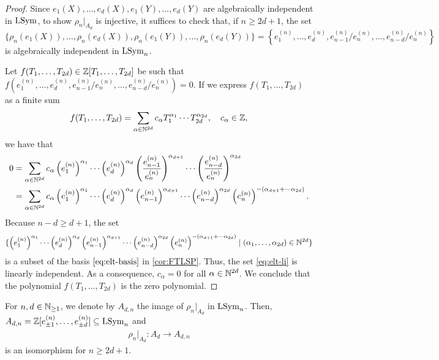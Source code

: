 \documentclass[11pt]{amsart}
\begin{document}
\begin{proof}
    Since \(e_1(X),\dots,e_d(X),e_1 (Y),\dots,e_d(Y)\) are algebraically independent in \(\mathrm{LSym}\), to show \(\rho_n|_{A_d}\) is injective, it suffices to check that, if \(n \geq 2d + 1\), the set
    \[\{\rho_n(e_1(X)),\dots,\rho_n(e_d (X)),\rho_n (e_1 (Y)),\dots,\rho_n  (e_d(Y))\}=\left\{e_1^{(n)},\dots, e_d^{(n)}, e_{n- 1}^{(n)} /e_n^{(n)},\dots,  e_{n - d}^{(n)}/e_n^{(n)} \right\}\] is algebraically independent in \(\mathrm{LSym}_n\).

    Let \(f(T_1, \dots, T_{2d}) \in \mathbb{Z} [T_1,\dots,T_{2d}]\) be such that \(f(e_1^{(n)},\dots, e_d^{(n)},e_{n - 1}^{(n)}/e_n^{(n)},\dots,e_{n -d}^{(n)}/e_n^{(n)}) = 0\). If we express \(f(T_1, \dots, T_{2d})\) as a finite sum
    \[
    f(T_1, \dots, T_{2d}) =\sum_{\alpha \in \mathbb{N}^{2d}} c_\alpha T_1^{\alpha_1} \cdots T_{2d}^{\alpha_{2d}}, \quad c_\alpha \in \mathbb{Z},
    \]
    we have that
    \begin{align*}
    0 
    &= \sum_{\alpha \in \mathbb{N}^{2d}} c_\alpha \left(e_1^{(n)}\right)^{\alpha_1} \cdots \left(e_d^{(n)}\right) ^{\alpha_{d}} \left(\frac{e_{n -1}^{(n)}}{e_n^{(n)}}\right)^{\alpha_{d + 1}} \cdots \left(\frac{e_{n -d}^{(n)}}{e_n^{(n)}}\right)^{\alpha_{2d}}\\
    &=\sum_{\alpha \in \mathbb{N}^{2d}} c_\alpha \left(e_1^{(n)}\right) ^{\alpha_1} \cdots \left(e_d^{(n)}\right) ^{\alpha_{d}} \left(e_{n -1}^{(n)}\right) ^{\alpha_{d + 1}} \cdots \left(e_{n -d}^{(n)}\right) ^{\alpha_{2d}} \left(e_n^{(n)}\right) ^{-(\alpha_{d + 1} + \cdots \alpha_{2d})}.
    \end{align*}
    Because \(n  - d\geq d + 1\), the set
    \begin{align}
        \{\left(e_1^{(n)}\right) ^{\alpha_1} \cdots \left(e_d^{(n)}\right) ^{\alpha_{d}} \left(e_{n -1}^{(n)}\right) ^{\alpha_{d + 1}} \cdots \left(e_{n -d}^{(n)}\right) ^{\alpha_{2d}} \left(e_n^{(n)}\right) ^{-(\alpha_{d + 1} + \cdots \alpha_{2d})} \mid (\alpha_1,\dots,\alpha_{2d}) \in \mathbb{N}^{2d}\} \label{eq:elt-li}
    \end{align}
    is a subset of the basis $\cref{eq:elt-basis}$ in \cref{cor:FTLSP}. Thus, the set \cref{eq:elt-li} is linearly independent. As a consequence,  \(c_\alpha = 0\) for all \(\alpha \in \mathbb{N}^{2d}\). We conclude that the polynomial \(f(T_1, \dots, T_{2d})\) is the zero polynomial. 
\end{proof}


\begin{cor} \label{cor:giraffe}
For $n,d \in \mathbb{N}_{\geq 1}$, we denote by $A_{d,n}$ the image of $\rho_n|_{A_d}$ in $\mathrm{LSym}_n$. Then, \(A_{d,n} = \mathbb{Z} [e_{\pm1}^{(n)},\dots,e_{\pm d}^{(n)}] \subseteq \mathrm{LSym}_n\) and
    \begin{align*}
    \rho_n|_{A_d} \colon A_d \longrightarrow A_{d,n}
\end{align*}
is an isomorphism for \(n \geq 2d + 1\). 
\end{cor}
\end{document}
